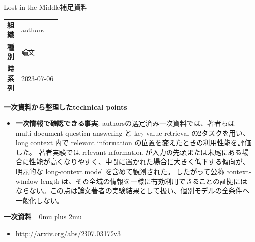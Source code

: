 \begin{technicalnote}{Lost in the Middle}{補足資料}
\begingroup
\begin{tabularx}{\linewidth}{@{}>{\bfseries}p{0.22\linewidth}X@{}}
組織 & authors \\
種別 & 論文 \\
時系列 & 2023-07-06 \\
\end{tabularx}
\smallskip
{\bfseries 一次資料から整理したtechnical points}
\begin{itemize}[leftmargin=1.5em,itemsep=0.35em]
\item \textbf{一次情報で確認できる事実}: authorsの選定済み一次資料では、著者らは multi-document question answering と key-value retrieval の2タスクを用い、long context 内で relevant information の位置を変えたときの利用性能を評価した。 著者実験では relevant information が入力の先頭または末尾にある場合に性能が高くなりやすく、中間に置かれた場合に大きく低下する傾向が、明示的な long-context model を含めて観測された。 したがって公称 context-window length は、その全域の情報を一様に有効利用できることの証拠にはならない。この点は論文著者の実験結果として扱い、個別モデルの全条件へ一般化しない。
\end{itemize}
\begin{minipage}{\linewidth}
\begin{samepage}
{\bfseries 一次資料}
\begingroup\sloppy
\Urlmuskip=0mu plus 2mu\relax
\begin{itemize}[leftmargin=1.5em,itemsep=0.25em]
\item {\scriptsize\url{http://arxiv.org/abs/2307.03172v3}}
\end{itemize}
\endgroup
\end{samepage}
\end{minipage}
\endgroup
\end{technicalnote}
\medskip
